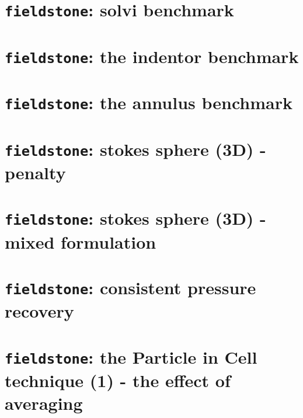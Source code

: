 \documentclass[a4paper]{article}
\begin{document}
\section{{\tt fieldstone}: solvi benchmark}


\newpage
\section{{\tt fieldstone}: the indentor benchmark}


\newpage
\section{{\tt fieldstone}: the annulus benchmark}



\newpage
\section{{\tt fieldstone}: stokes sphere (3D) - penalty\label{f5}}


\newpage
\section{{\tt fieldstone}: stokes sphere (3D) - mixed formulation\label{f5}}


\newpage
\section{{\tt fieldstone}: consistent pressure recovery }


\newpage
\section{{\tt fieldstone}: the Particle in Cell technique (1) - the effect of averaging}

\end{document}
